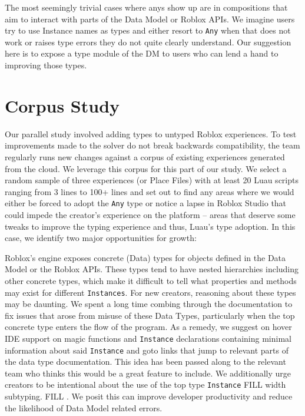 \documentclass[acmsmall,screen,review,anonymous]{acmart}
\newcommand{\code}[1]{\texttt{#1}}
\newcommand{\Any}{\code{Any}}
\begin{document}
\label{s:approach:5}
The most seemingly trivial cases where anys show up are in compositions that aim to 
interact with parts of the Data Model or Roblox APIs. We imagine users try to use 
Instance names as types and either resort to \Any{} when that does not work or raises
type errors they do not quite clearly understand. Our suggestion here is to expose a 
type module of the DM to users who can lend a hand to improving those types.

\section{Corpus Study}
\label{s:place}

Our parallel study involved adding types to untyped Roblox experiences.
To test improvements made to the solver do not break backwards compatibility, 
the team regularly runs new changes against a corpus of existing experiences 
generated from the cloud. We leverage this corpus for this part of our study.
We select a random sample of three experiences (or Place Files) 
with at least 20 Luau scripts ranging from 3 lines to 100+ lines 
and set out to find any areas where we would either be forced to adopt 
the \Any{} type or notice a lapse in Roblox Studio that could impede the 
creator's experience on the platform -- areas that deserve some tweaks 
to improve the typing experience and thus, Luau's type adoption. In this case, 
we identify two major opportunities for growth:

\label{s:place:1}
Roblox's engine exposes concrete (Data) types for objects defined in the Data Model or 
the Roblox APIs. These types tend to have nested hierarchies including other concrete 
types, which make it difficult to tell what properties and methods may exist for different 
\code{Instances}. For new creators, reasoning about these types may be daunting. We 
spent a long time combing through the documentation to fix issues that arose from 
misuse of these Data Types, particularly when the top concrete type enters the flow of 
the program. As a remedy, we suggest on hover IDE support on magic functions and 
\code{Instance} declarations containing minimal information about said \code{Instance} 
and goto links that jump to relevant parts of the data type documentation. This idea 
has been passed along to the relevant team who thinks this would be a great feature 
to include.  We additionally urge creators to be intentional about the use of the 
top type \code{Instance} FILL width subtyping. FILL . We posit this can improve developer productivity and 
reduce the likelihood of Data Model related errors.
\end{document}
